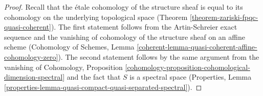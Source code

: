 \documentclass[10pt,a4paper]{amsart}
\theoremstyle{plain}
\theoremstyle{definition}
\theoremstyle{remark}
\numberwithin{equation}{subsection}
\begin{document}
\begin{proof}
Recall that the \'etale cohomology of the structure sheaf is equal
to its cohomology on the underlying topological space
(Theorem \ref{theorem-zariski-fpqc-quasi-coherent}).
The first statement follows from the Artin-Schreier exact sequence
and the vanishing of cohomology of the structure sheaf on an affine
scheme (Cohomology of Schemes, Lemma
\ref{coherent-lemma-quasi-coherent-affine-cohomology-zero}).
The second statement follows by the same argument from
the vanishing of Cohomology, Proposition
\ref{cohomology-proposition-cohomological-dimension-spectral}
and the fact that $S$ is a spectral space
(Properties, Lemma
\ref{properties-lemma-quasi-compact-quasi-separated-spectral}).
\end{proof}
\end{document}
